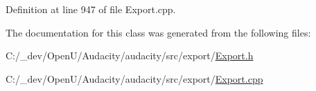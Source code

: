 Definition at line 947 of file Export.\+cpp.



The documentation for this class was generated from the following files\+:\begin{DoxyCompactItemize}
\item 
C\+:/\+\_\+dev/\+Open\+U/\+Audacity/audacity/src/export/\hyperlink{src_2export_2export_8h}{Export.\+h}\item 
C\+:/\+\_\+dev/\+Open\+U/\+Audacity/audacity/src/export/\hyperlink{_export_8cpp}{Export.\+cpp}\end{DoxyCompactItemize}
